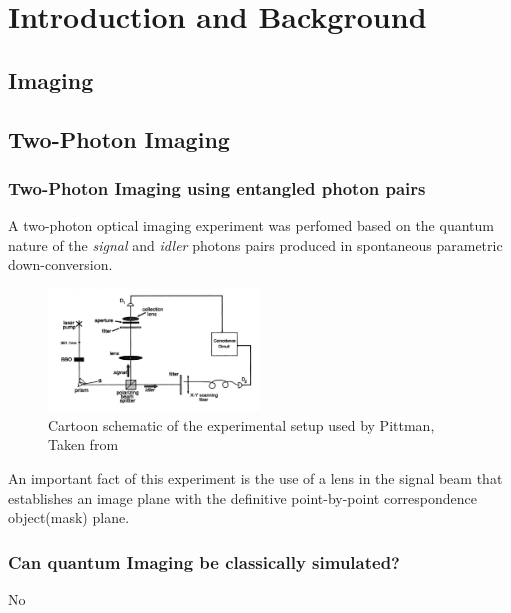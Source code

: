 
\chapter{Introduction and Background} %

\label{Chapter1} %


\section{Imaging}


\section{Two-Photon Imaging}

\subsection{Two-Photon Imaging using entangled photon pairs}
A two-photon optical imaging experiment was perfomed based on the quantum nature of the \textit{signal} and \textit{idler}
photons pairs produced in spontaneous parametric down-conversion\cite{pittman}.
\begin{figure}[h]
\centering
\includegraphics[width=0.5\textwidth]{Figures/pittman.png}
\caption{Cartoon schematic of the experimental setup used by Pittman, Taken from \cite{pittman}} 
\label{fig:pittman}
\end{figure}
An important fact of this experiment is the use of a lens in the signal beam that establishes an image plane with the definitive point-by-point correspondence object(mask) plane.

\subsection{Can quantum Imaging be classically simulated?}
No\cite{simulated}


